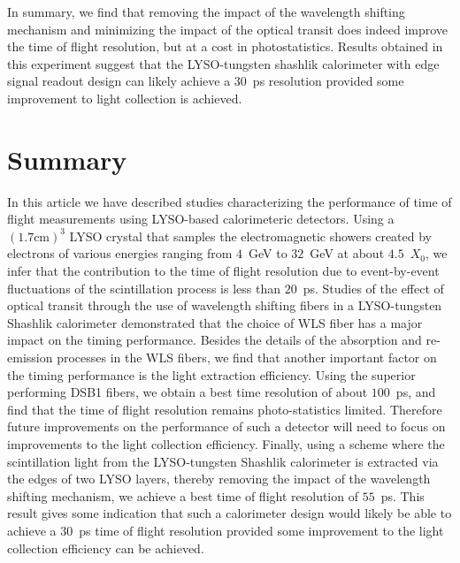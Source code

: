 \documentclass[12pt]{article}
\begin{document}
In summary, we find that removing the impact of the wavelength shifting mechanism
and minimizing the impact of the optical transit does indeed improve the time
of flight resolution, but at a cost in photostatistics. Results obtained in this
experiment suggest that the LYSO-tungsten shashlik calorimeter with edge
signal readout design can likely achieve a $30$~ps resolution provided 
some improvement to light collection is achieved.

\section{Summary}

In this article we have described studies characterizing the 
performance of time of flight measurements using
LYSO-based calorimeteric detectors. Using a $(1.7\mathrm{ cm})^{3}$
LYSO crystal that samples the electromagnetic showers created
by electrons of various energies ranging from $4$~GeV to $32$~GeV
at about $4.5$~$X_{0}$, we infer that the contribution to the 
time of flight resolution due to event-by-event fluctuations 
of the scintillation process is less than $20$~ps. Studies of the
effect of optical transit through the use of wavelength shifting
fibers in a LYSO-tungsten Shashlik calorimeter demonstrated that
the choice of WLS fiber has a major impact on the timing performance.
Besides the details of the absorption and re-emission processes in
the WLS fibers, we find that another important factor on
the timing performance is the light extraction efficiency. Using
the superior performing DSB1 fibers, we obtain a best time
resolution of about $100$~ps, and find that the time
of flight resolution remains photo-statistics limited.
Therefore future improvements on the performance of such a 
detector will need to focus on improvements to the light collection
efficiency. Finally, using a scheme where the scintillation
light from the LYSO-tungsten Shashlik calorimeter is extracted
via the edges of two LYSO layers, thereby removing the impact
of the wavelength shifting mechanism, we achieve a best time of 
flight resolution of $55$~ps. This result gives some indication that such a
calorimeter design would likely be able to achieve a $30$~ps 
time of flight resolution provided some improvement to the 
light collection efficiency can be achieved.
\end{document}
